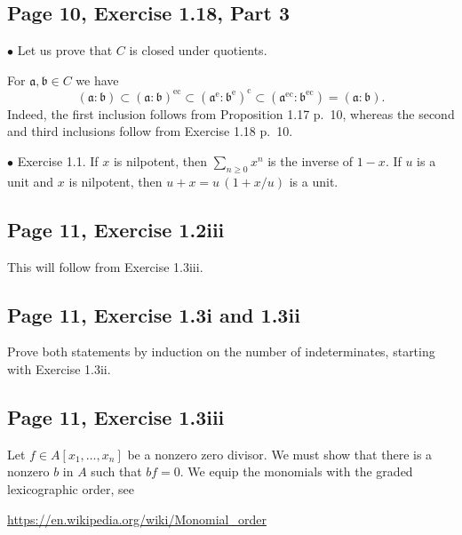 \documentclass[parskip=half,fontsize=12pt]{scrartcl}%
\newcommand{\oo}{\operatorname}\newcommand{\ooo}{\operatorname*}
\newcommand{\mf}{\mathfrak}
\newcommand{\aaa}{\mf a}
\newcommand{\bbb}{\mf b}
\newcommand{\bu}{\bullet}
\begin{document}
\subsection{Page 10, Exercise 1.18, Part 3}%

$\bu$ Let us prove that $C$ is closed under quotients. 

For $\aaa,\bbb\in C$ we have
$$
(\aaa:\bbb)\subset(\aaa:\bbb)^{\oo{ec}}\subset(\aaa^{\oo e}:\bbb^{\oo e})^{\oo c}\subset(\aaa^{\oo{ec}}:\bbb^{\oo{ec}})=(\aaa:\bbb).
$$ 
Indeed, the first inclusion follows from Proposition 1.17 p.~10, whereas the second and third inclusions follow from Exercise 1.18 p.~10. 

$\bu$ Exercise 1.1. If $x$ is nilpotent, then $\sum_{n\ge0}x^n$ is the inverse of $1-x$. If $u$ is a unit and $x$ is nilpotent, then $u+x=u\,(1+x/u)$ is a unit.

\subsection{Page 11, Exercise 1.2iii}%

This will follow from Exercise 1.3iii.



\subsection{Page 11, Exercise 1.3i and 1.3ii}%

Prove both statements by induction on the number of indeterminates, starting with Exercise 1.3ii.

\subsection{Page 11, Exercise 1.3iii}%

Let $f\in A[x_1,\dots,x_n]$ be a nonzero zero divisor. We must show that there is a nonzero $b$ in $A$ such that $bf=0$. We equip the monomials with the graded lexicographic order, see 

\href{https://en.wikipedia.org/wiki/Monomial_order}{https://en.wikipedia.org/wiki/Monomial\_order}
\end{document}
